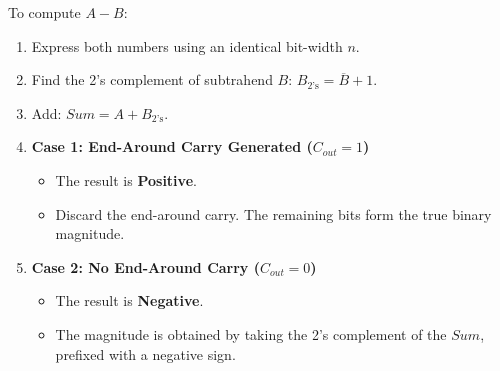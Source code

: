 \begin{keyequation}
To compute $A - B$:
\begin{enumerate}
    \item Express both numbers using an identical bit-width $n$.
    \item Find the 2's complement of subtrahend $B$: $B_{2\text{'s}} = \overline{B} + 1$.
    \item Add: $Sum = A + B_{2\text{'s}}$.
    \item \textbf{Case 1: End-Around Carry Generated ($C_{out} = 1$)}
    \begin{itemize}
        \item The result is \textbf{Positive}.
        \item Discard the end-around carry. The remaining bits form the true binary magnitude.
    \end{itemize}
    \item \textbf{Case 2: No End-Around Carry ($C_{out} = 0$)}
    \begin{itemize}
        \item The result is \textbf{Negative}.
        \item The magnitude is obtained by taking the 2's complement of the $Sum$, prefixed with a negative sign.
    \end{itemize}
\end{enumerate}
\end{keyequation}

